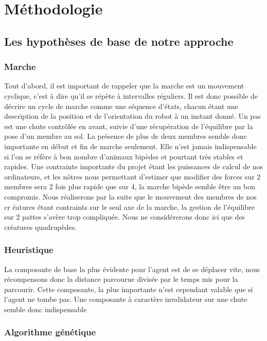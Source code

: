 \documentclass[journal, a4paper]{IEEEtran}
\begin{document}
\section{Méthodologie}\label{sec:met}
	\subsection{Les hypothèses de base de notre approche}\label{subsec:les-hypotheses-de-base-de-notre-approche}
	\subsubsection{Marche}
	Tout d'abord, il est important de rappeler que la marche est un
	mouvement cyclique, c'est à dire qu'il se répète à intervalles
	réguliers. Il est donc possible de décrire un cycle de marche
	comme une séquence d'états, chacun étant une description de la
	position et de l'orientation du robot à un instant donné.
	Un pas est une chute contrôlée en avant, suivie d'une récupération
	de l'équilibre par la pose d'un membre au sol.
	La présence de plus de deux membres semble donc importante en début
	et fin de marche seulement. Elle n'est jamais indispensable si l'on
	se réfère à bon nombre d'animaux bipèdes et pourtant très stables et
	rapides.
	Une contrainte importante du projet étant les puissances de calcul
	de nos ordinateurs, et les nôtres nous permettant d'estimer que
	modifier des forces sur 2 membres sera 2 fois plus rapide que sur 4,
	la marche bipède semble être un bon compromis.
	Nous réaliserons par la suite que le mouvement des membres de nos cr
	éatures
	étant contraints sur le seul axe de la marche, la gestion de
	l'équilibre sur 2 pattes s'avère trop compliquée.
	Nous ne considérerons donc ici que des créatures quadrupèdes.

	\subsubsection{Heuristique}

	La composante de base la plus évidente pour l'agent est de se
	déplacer vite, nous récompensons donc la distance parcourue
	divisée par le temps mis pour la parcourir. Cette composante,
	la plus importante n'est cependant valable que si l'agent ne tombe
	pas. Une composante à caractère invalidateur sur une chute semble
	donc indispensable

	\subsubsection{Algorithme génétique}
\end{document}
